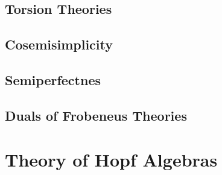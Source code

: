 \documentclass[12pt]{scrartcl}%
\renewcommand{\.}{\; . \;} %
\begin{document}
\subsection{Torsion Theories}
\subsection{Cosemisimplicity}
\subsection{Semiperfectnes}
\subsection{Duals of Frobeneus Theories}
\newpage
\section{Theory of Hopf Algebras}
\end{document}

